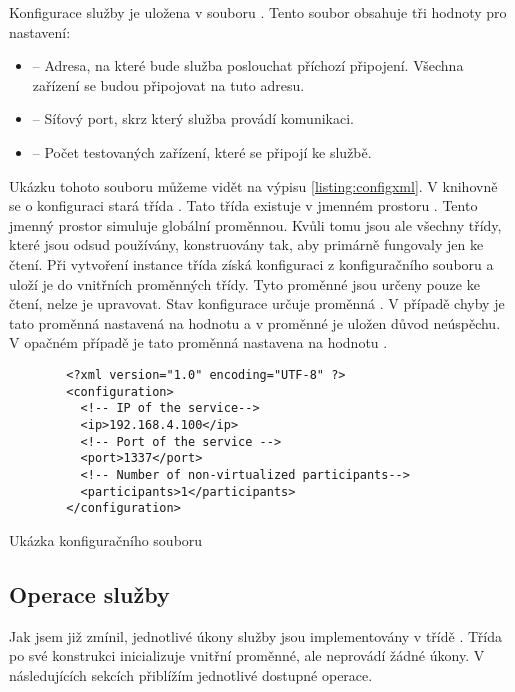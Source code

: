 Konfigurace služby je uložena v souboru . Tento soubor obsahuje tři hodnoty pro nastavení:

\begin{itemize}
    \item {} -- Adresa, na které bude služba poslouchat příchozí připojení. Všechna zařízení se budou připojovat na tuto adresu.
    \item {} -- Síťový port, skrz který služba provádí komunikaci.
    \item {} -- Počet testovaných zařízení, které se připojí ke službě.   
\end{itemize}

Ukázku tohoto souboru můžeme vidět na výpisu \ref{listing:configxml}. V knihovně se o konfiguraci stará třída . Tato třída existuje v jmenném prostoru . Tento jmenný prostor simuluje globální proměnnou. Kvůli tomu jsou ale všechny třídy, které jsou odsud používány, konstruovány tak, aby primárně fungovaly jen ke čtení. Při vytvoření instance třída získá konfiguraci z konfiguračního souboru a uloží je do vnitřních proměnných třídy. Tyto proměnné jsou určeny pouze ke čtení, nelze je upravovat. Stav konfigurace určuje proměnná . V případě chyby je tato proměnná nastavená na hodnotu  a v proměnné  je uložen důvod neúspěchu. V opačném případě je tato proměnná nastavena na hodnotu .

\begin{listing}[htbp]
    \centering
    \begin{verbatim}
        <?xml version="1.0" encoding="UTF-8" ?>
        <configuration>
          <!-- IP of the service-->
          <ip>192.168.4.100</ip>
          <!-- Port of the service -->
          <port>1337</port>
          <!-- Number of non-virtualized participants-->
          <participants>1</participants>
        </configuration>
    \end{verbatim}
    \caption{Ukázka konfiguračního souboru}
    \label{listing:configxml}
\end{listing}


\subsection{Operace služby}

Jak jsem již zmínil, jednotlivé úkony služby jsou implementovány v třídě . 
Třída po své konstrukci inicializuje vnitřní proměnné, ale neprovádí žádné úkony. V následujících sekcích přiblížím jednotlivé dostupné operace.

